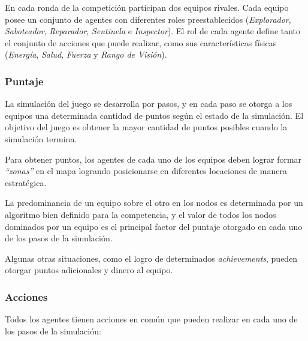  En cada ronda de la competición participan dos equipos rivales.
 Cada equipo posee un conjunto de agentes con diferentes roles
 preestablecidos (\textit{Explorador}, \textit{Saboteador},
 \textit{Reparador}, \textit{Sentinela} e \textit{Inspector}).
 El rol de cada agente define tanto el conjunto de acciones que puede
 realizar, como sus características físicas (\textit{Energía},
 \textit{Salud}, \textit{Fuerza} y \textit{Rango de Visión}).

\subsubsection{Puntaje}
\label{subsub:puntaje}

 La simulación del juego se desarrolla por pasos, y en cada paso se
 otorga a los equipos una determinada cantidad de puntos según el
 estado de la simulación.
 El objetivo del juego es obtener la mayor cantidad de puntos posibles
 cuando la simulación termina.
 
 Para obtener puntos, los agentes de cada uno de los equipos deben
 lograr formar \textit{"`zonas"'} en el mapa logrando posicionarse en
 diferentes locaciones de manera estratégica. 
 
 La predominancia de un equipo sobre el otro en los nodos es
 determinada por un algoritmo bien definido para la competencia, y el
 valor de todos los nodos dominados por un equipo es el principal
 factor del puntaje otorgado en cada uno de los pasos de la simulación.
 
 Algunas otras situaciones, como el logro de determinados
 \textit{achievements}, pueden otorgar puntos adicionales y dinero al
 equipo.

\subsubsection{Acciones}
\label{subsub:acciones}

 Todos los agentes tienen acciones en común que pueden realizar en cada
 uno de los pasos de la simulación:
 
